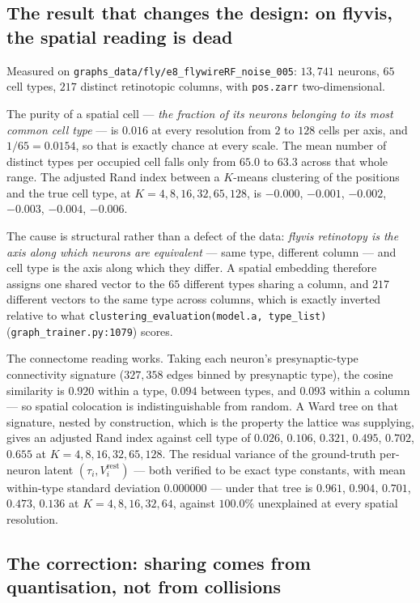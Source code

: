 \documentclass[11pt,a4paper]{article}
\begin{document}
\subsection{The result that changes the design: on flyvis, the spatial reading is dead}

Measured on \texttt{graphs\_data/fly/e8\_flywireRF\_noise\_005}: $13{,}741$ neurons, $65$
cell types, $217$ distinct retinotopic columns, with \texttt{pos.zarr} two-dimensional.

The purity of a spatial cell --- \emph{the fraction of its neurons belonging to its most
common cell type} --- is $0.016$ at every resolution from $2$ to $128$ cells per axis, and
$1/65 = 0.0154$, so that is exactly chance at every scale. The mean number of distinct types
per occupied cell falls only from $65.0$ to $63.3$ across that whole range. The adjusted
Rand index between a $K$-means clustering of the positions and the true cell type, at
$K = 4, 8, 16, 32, 65, 128$, is $-0.000$, $-0.001$, $-0.002$, $-0.003$, $-0.004$, $-0.006$.

The cause is structural rather than a defect of the data: \emph{flyvis retinotopy is the
axis along which neurons are equivalent} --- same type, different column --- and cell type
is the axis along which they differ. A spatial embedding therefore assigns one shared vector
to the $65$ different types sharing a column, and $217$ different vectors to the same type
across columns, which is exactly inverted relative to what
\texttt{clustering\_evaluation(model.a, type\_list)} (\texttt{graph\_trainer.py:1079})
scores.

The connectome reading works. Taking each neuron's presynaptic-type connectivity signature
($327{,}358$ edges binned by presynaptic type), the cosine similarity is $0.920$ within a
type, $0.094$ between types, and $0.093$ within a column --- so spatial colocation is
indistinguishable from random. A Ward tree on that signature, nested by construction, which
is the property the lattice was supplying, gives an adjusted Rand index against cell type of
$0.026$, $0.106$, $0.321$, $0.495$, $\mathbf{0.702}$, $0.655$ at
$K = 4, 8, 16, 32, 65, 128$. The residual variance of the ground-truth per-neuron latent
$(\tau_i, V_i^{\mathrm{rest}})$ --- both verified to be exact type constants, with mean
within-type standard deviation $0.000000$ --- under that tree is $0.961$, $0.904$, $0.701$,
$0.473$, $\mathbf{0.136}$ at $K = 4, 8, 16, 32, 64$, against $100.0\%$ unexplained at every
spatial resolution.

\subsection{The correction: sharing comes from quantisation, not from collisions}
\end{document}
